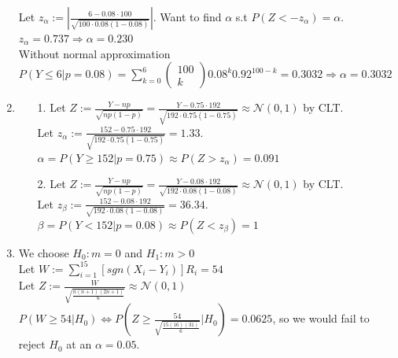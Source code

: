 \documentclass[10pt]{article}
\begin{document}
\begin{enumerate}[label=\textbf{Problem \arabic*.}]
    Let $z_\alpha:=|\frac{6-0.08\cdot 100}{\sqrt{100\cdot 0.08(1-0.08)}}|$. Want to find $\alpha$ s.t $P(Z<-z_\alpha)=\alpha$. $z_\alpha=0.737\Rightarrow \alpha=0.230$\\
    Without normal approximation $\displaystyle P(Y\le 6|p=0.08)=\sum_{k=0}^{6}\begin{pmatrix}    100\\   k\end{pmatrix}0.08^k0.92^{100-k}=0.3032\Rightarrow \alpha=0.3032$
    \item \begin{itemize}
        \item [1.] Let $Z:=\frac{Y-np}{\sqrt{np(1-p)}}=\frac{Y-0.75\cdot 192}{\sqrt{192\cdot 0.75(1-0.75)}}\approx\mathcal{N}(0,1)$ by CLT.\\
        Let $z_\alpha:=\frac{152-0.75\cdot 192}{\sqrt{192\cdot 0.75(1-0.75)}}=1.33$.
        $\alpha=P(Y\ge 152|p=0.75)\approx P(Z>z_\alpha)=0.091$
        \item [2.] Let $Z:=\frac{Y-np}{\sqrt{np(1-p)}}=\frac{Y-0.08\cdot 192}{\sqrt{192\cdot 0.08(1-0.08)}}\approx\mathcal{N}(0,1)$ by CLT.\\
        Let $z_\beta:=\frac{152-0.08\cdot 192}{\sqrt{192\cdot 0.08(1-0.08)}}=36.34$.
        $\beta=P(Y<152|p=0.08)\approx P(Z<z_\beta)=1$
    \end{itemize}
    \item We choose $H_0:m=0$ and $H_1:m>0$\\
    Let $\displaystyle W:=\sum_{i=1}^{15}[sgn(X_i-Y_i)]R_i=54$\\
    Let $Z:=\frac{W}{\sqrt{\frac{n(n+1)(2n+1)}{6}}}\approx \mathcal{N}(0,1)$\\
    $P(W\ge 54|H_0)\Leftrightarrow P(Z\ge \frac{54}{\sqrt{\frac{15(16)(31)}{6}}}|H_0)=0.0625$, so we would fail to reject $H_0$ at an $\alpha=0.05$.
\end{enumerate}
\end{document}
